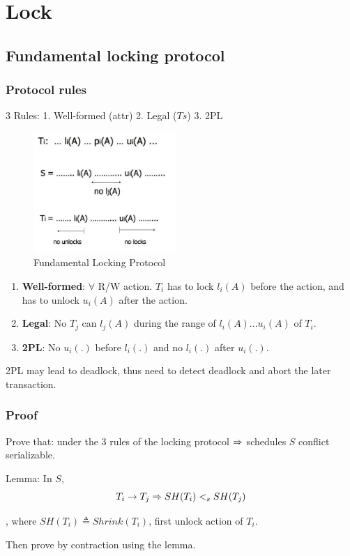 \documentclass[a4paper]{report}
\begin{document}
\section{Lock}
\subsection{Fundamental locking protocol}
\subsubsection{Protocol rules}
3 Rules: 1. Well-formed (attr) 2. Legal ($Ts$) 3. 2PL
\begin{figure}[H]
    \centerline{\includegraphics[height = 1.8in]{img/lockFundamental}}
    \caption{Fundamental Locking Protocol}
  \label{fig:fundamentalLockingProtocol}
\end{figure}
\begin{enumerate}
\item \textbf{Well-formed}: $\forall$ R/W action. $T_i$ has to lock $l_i(A)$ before the action, and has to unlock $u_i(A)$ after the action.
\item \textbf{Legal}: No $T_j$ can $l_j(A)$ during the range of $l_i(A) ... u_i(A)$ of $T_i$.
\item \textbf{2PL}: No $u_i(.)$ before $l_i(.)$ and no $l_i(.)$ after $u_i(.)$. 
\end{enumerate}
2PL may lead to deadlock, thus need to detect deadlock and abort the later transaction.

\subsubsection{Proof}
Prove that: under the 3 rules of the locking protocol $\Rightarrow$ schedules $S$ conflict serializable. 

Lemma: In $S$, 
$$
T_i \rightarrow T_j \Rightarrow SH(T_i) <_s SH(T_j)
$$

, where $SH(T_i)\triangleq Shrink(T_i)$, first unlock action of $T_i$.

Then prove by contraction using the lemma. 
\end{document}
